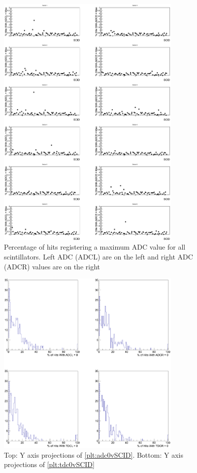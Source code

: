 \begin{figure}
    \includegraphics[width=0.8\textwidth]{figures/calib/tof/tofko/adcMax.eps}
    \caption{Percentage of hits registering a maximum ADC value for all scintillators. Left ADC (ADCL) are on the left and right ADC (ADCR) values are on the right}
    \label{plt:adcMvSCID}
\end{figure}

\begin{figure}
    \includegraphics[width=0.8\textwidth]{figures/calib/tof/tofko/adctdc0perc.eps}
    \caption{Top: Y axis projections of \ref{plt:adc0vSCID}. Bottom: Y axis projections of \ref{plt:tdc0vSCID}}
    \label{plt:proj}
\end{figure}
